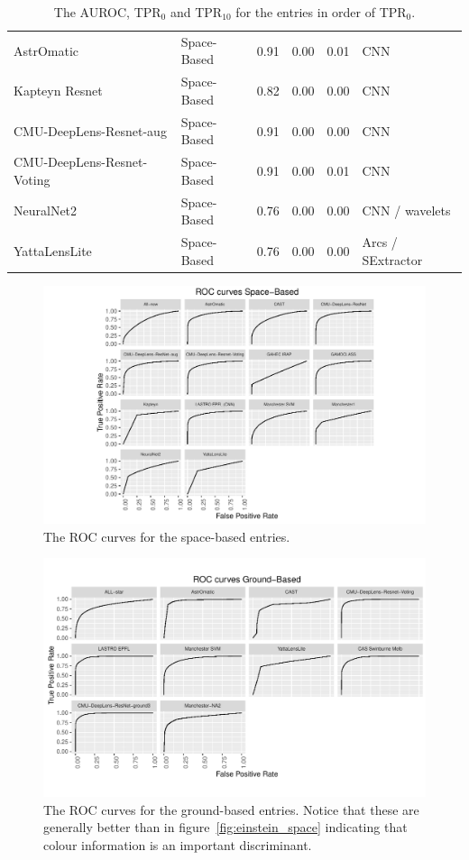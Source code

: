 \documentclass{aa}
\begin{document}
\begin{table}
\begin{tabular}{llrrrl}
   AstrOmatic & Space-Based & 0.91 & 0.00 & 0.01 & CNN \\ 
   Kapteyn Resnet& Space-Based & 0.82 & 0.00 & 0.00 & CNN \\ 
   CMU-DeepLens-Resnet-aug & Space-Based & 0.91 & 0.00 & 0.00 & CNN \\ 
   CMU-DeepLens-Resnet-Voting & Space-Based & 0.91 & 0.00 & 0.01 & CNN \\ 
   NeuralNet2 & Space-Based & 0.76 & 0.00 & 0.00 & CNN / wavelets \\ 
   YattaLensLite & Space-Based & 0.76 & 0.00 & 0.00 & Arcs / SExtractor \\ 
   \hline
\end{tabular}
\caption{The AUROC, TPR$_0$ and TPR$_{10}$ for the entries in order of TPR$_0$.  }
\label{table:TPR0}
\end{table}

\begin{figure}
 \includegraphics[width=2\columnwidth]{figures/roc_space.pdf}
 \caption{The ROC curves for the space-based entries.}
 \label{fig:roc_space}
\end{figure}

\begin{figure}
 \includegraphics[width=2\columnwidth]{figures/roc_ground.pdf}
 \caption{The ROC curves for the ground-based entries.  Notice that these are generally better than in figure~\ref{fig:einstein_space} indicating that colour information is an important discriminant. }
 \label{fig:roc_ground}
\end{figure}
\end{document}
